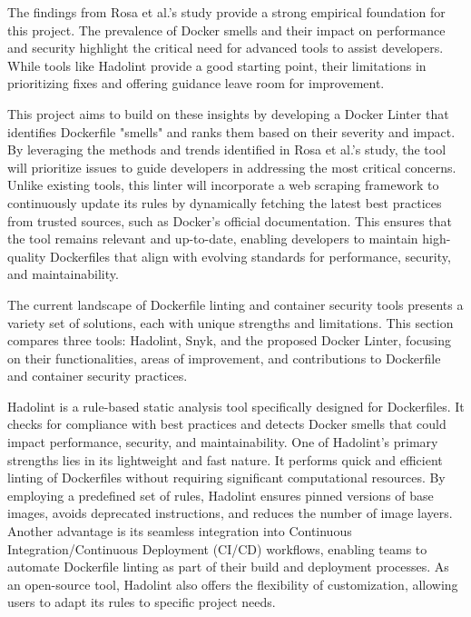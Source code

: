 The findings from Rosa et al.’s study provide a strong empirical foundation for this project. The prevalence of Docker smells and their impact on performance and security highlight the critical need for advanced tools to assist developers. While tools like Hadolint provide a good starting point, their limitations in prioritizing fixes and offering guidance leave room for improvement.

This project aims to build on these insights by developing a Docker Linter that identifies Dockerfile "smells" and ranks them based on their severity and impact. By leveraging the methods and trends identified in Rosa et al.’s study, the tool will prioritize issues to guide developers in addressing the most critical concerns. Unlike existing tools, this linter will incorporate a web scraping framework to continuously update its rules by dynamically fetching the latest best practices from trusted sources, such as Docker’s official documentation. This ensures that the tool remains relevant and up-to-date, enabling developers to maintain high-quality Dockerfiles that align with evolving standards for performance, security, and maintainability.

The current landscape of Dockerfile linting and container security tools presents a variety set of solutions, each with unique strengths and limitations. This section compares three tools: Hadolint, Snyk, and the proposed Docker Linter, focusing on their functionalities, areas of improvement, and contributions to Dockerfile and container security practices.

Hadolint is a rule-based static analysis tool specifically designed for Dockerfiles. It checks for compliance with best practices and detects Docker smells that could impact performance, security, and maintainability. One of Hadolint’s primary strengths lies in its lightweight and fast nature. It performs quick and efficient linting of Dockerfiles without requiring significant computational resources. By employing a predefined set of rules, Hadolint ensures pinned versions of base images, avoids deprecated instructions, and reduces the number of image layers. Another advantage is its seamless integration into Continuous Integration/Continuous Deployment (CI/CD) workflows, enabling teams to automate Dockerfile linting as part of their build and deployment processes. As an open-source tool, Hadolint also offers the flexibility of customization, allowing users to adapt its rules to specific project needs.\cite{wilson_2023}

